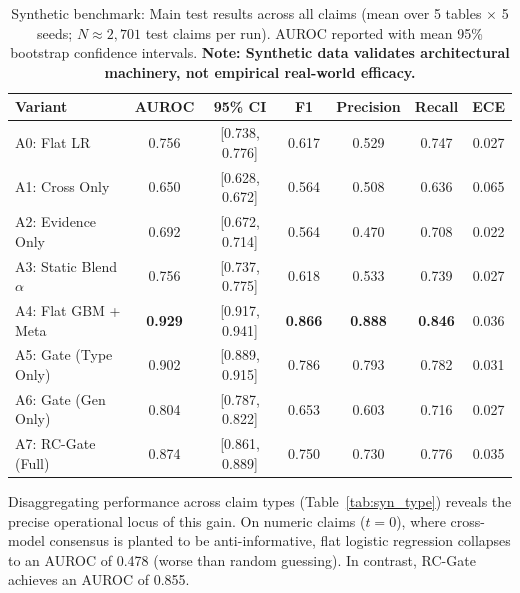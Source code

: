 \documentclass[pdflatex,sn-mathphys,Numbered]{sn-jnl}
\begin{document}
\begin{table}[htbp]
\caption{Synthetic benchmark: Main test results across all claims (mean over 5 tables $\times$ 5 seeds; $N \approx 2,701$ test claims per run). AUROC reported with mean 95\% bootstrap confidence intervals. \textbf{Note: Synthetic data validates architectural machinery, not empirical real-world efficacy.}}\label{tab:syn_main}
\footnotesize
\setlength{\tabcolsep}{3.5pt}
\begin{tabular}{@{}lcccccc@{}}
\toprule
\textbf{Variant} & \textbf{AUROC} & \textbf{95\% CI} & \textbf{F1} & \textbf{Precision} & \textbf{Recall} & \textbf{ECE} \\
\midrule
A0: Flat LR & 0.756 & [0.738, 0.776] & 0.617 & 0.529 & 0.747 & 0.027 \\
A1: Cross Only & 0.650 & [0.628, 0.672] & 0.564 & 0.508 & 0.636 & 0.065 \\
A2: Evidence Only & 0.692 & [0.672, 0.714] & 0.564 & 0.470 & 0.708 & 0.022 \\
A3: Static Blend $\alpha$ & 0.756 & [0.737, 0.775] & 0.618 & 0.533 & 0.739 & 0.027 \\
A4: Flat GBM + Meta & \textbf{0.929} & [0.917, 0.941] & \textbf{0.866} & \textbf{0.888} & \textbf{0.846} & 0.036 \\
A5: Gate (Type Only) & 0.902 & [0.889, 0.915] & 0.786 & 0.793 & 0.782 & 0.031 \\
A6: Gate (Gen Only) & 0.804 & [0.787, 0.822] & 0.653 & 0.603 & 0.716 & 0.027 \\
A7: RC-Gate (Full) & 0.874 & [0.861, 0.889] & 0.750 & 0.730 & 0.776 & 0.035 \\
\bottomrule
\end{tabular}
\end{table}

Disaggregating performance across claim types (Table~\ref{tab:syn_type}) reveals the precise operational locus of this gain. On numeric claims ($t=0$), where cross-model consensus is planted to be anti-informative, flat logistic regression collapses to an AUROC of 0.478 (worse than random guessing). In contrast, RC-Gate achieves an AUROC of 0.855.
\end{document}
